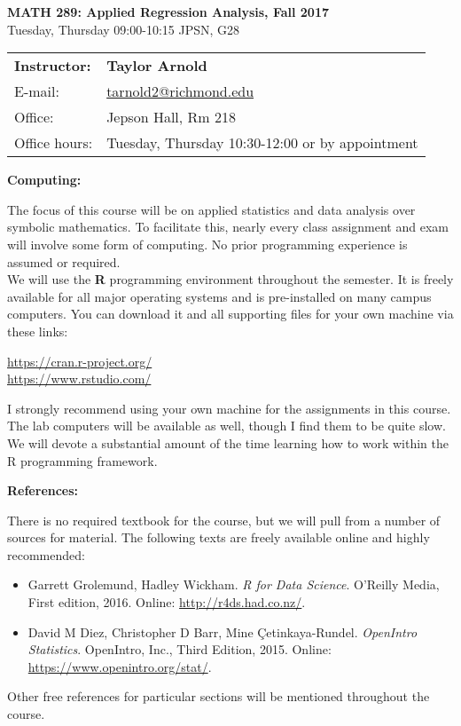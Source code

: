 \documentclass[12pt]{article}
\begin{document}
\begin{center}
{\bf MATH 289: Applied Regression Analysis, Fall 2017} \\
Tuesday, Thursday 09:00-10:15 \quad JPSN, G28\\
\end{center}

\bigskip

\noindent
\begin{tabular}{ l l }
{\bf Instructor:} &  {\bf Taylor Arnold} \\
E-mail: & \href{mailto:tarnold2@richmond.edu}{tarnold2@richmond.edu} \\
Office: & Jepson Hall, Rm 218 \\
Office hours: & Tuesday, Thursday 10:30-12:00 or by appointment
\end{tabular}

\vspace{0.5cm}

\textbf{Computing:} \vspace{6pt}

The focus of this course will be on applied statistics and data
analysis over symbolic mathematics. To facilitate this, nearly
every class assignment and exam will involve some form of
computing. No prior programming experience is assumed or
required. \\

We will use the \textbf{R} programming environment throughout the
semester. It is freely available for all major operating systems and
is pre-installed on many campus computers. You can download it and
all supporting files for your own machine via these links:
\begin{center}
\url{https://cran.r-project.org/} \\
\url{https://www.rstudio.com/}
\end{center}
I strongly recommend using your own machine for the assignments
in this course. The lab computers will be available as well,
though I find them to be quite slow. We will devote a substantial
amount of the time learning how to work within the R programming
framework.

\vspace{0.4cm}

\textbf{References:} \vspace{6pt}

There is no required textbook for the course, but we will pull
from a number of sources for material. The following texts are
freely available online and highly recommended:
\begin{itemize}\setlength\itemsep{0em}
\item Garrett Grolemund, Hadley Wickham. \textit{R for Data Science}.
  O'Reilly Media, First edition, 2016. Online: \url{http://r4ds.had.co.nz/}.
\item David M Diez, Christopher D Barr, Mine Çetinkaya-Rundel.
  \textit{OpenIntro Statistics}. OpenIntro, Inc., Third Edition,
  2015. Online: \url{https://www.openintro.org/stat/}.
\end{itemize}
Other free references for particular sections will be mentioned
throughout the course.
\end{document}

